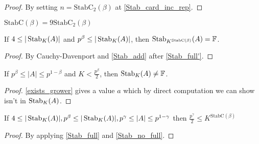 \begin{proof}
    \leanok
    By setting $n = \mathrm{StabC}_2(\beta)$ at \ref{Stab_card_inc_rep}.
\end{proof}

\begin{definition}
    \label{StabC}
    \leanok
    $\mathrm{StabC}(\beta) = 9 \mathrm{StabC}_2(\beta)$
\end{definition}

\begin{lemma}
    \label{Stab_full}
    \leanok
    If $4 \leq |\operatorname{\operatorname{Stab}}_K(A)|$ and $p^\beta \leq |\operatorname{\operatorname{Stab}}_K(A)|$,
    then $\operatorname{\operatorname{Stab}}_{K^{\mathrm{StabC}(\beta)}} (A) = \mathbb{F}$.
\end{lemma}

\begin{proof}
    \leanok
    By Cauchy-Davenport and \ref{Stab_add} after \ref{Stab_full'}.
\end{proof}

\begin{lemma}
    \label{Stab_no_full}
    \leanok
    If $p^\beta \leq |A| \leq p^{1 - \beta}$ and $K < \frac{p^\beta}2$, then
    $\operatorname{\operatorname{Stab}}_K(A) \neq \mathbb{F}$.
\end{lemma}

\begin{proof}
    \leanok
    \ref{exists_grower} gives a value $a$ which by direct computation we can show isn't in $\operatorname{\operatorname{Stab}}_K(A)$.
\end{proof}

\begin{lemma}
    \label{Stab_small}
    \leanok
    If $4 \leq |\operatorname{\operatorname{Stab}}_K(A)|, p^\beta \leq |\operatorname{\operatorname{Stab}}_K(A)|, p^\gamma \leq |A| \leq p^{1 - \gamma}$
    then $\frac{p^\gamma}2 \leq K^{\mathrm{StabC}(\beta)}$
\end{lemma}

\begin{proof}
    \leanok
    By applying \ref{Stab_full} and \ref{Stab_no_full}.
\end{proof}